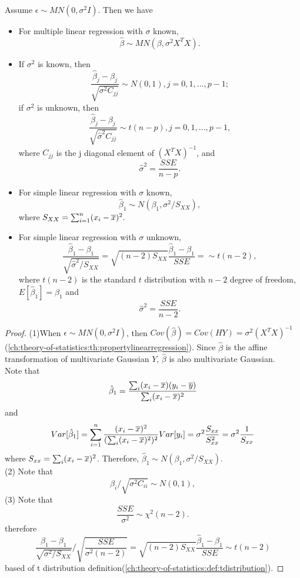 \begin{refsection}
\begin{theorem}\cite[93]{montgomery2012introduction}\label{ch:statistical-models:th:distributionOfCoefficientsLinearRegression}
	Assume $\epsilon \sim MN(0,\sigma^2 I)$. Then we have
	\begin{itemize}
		\item For multiple linear regression with $\sigma$ known, $$\hat{\beta} \sim MN(\beta,\sigma^2 X^TX).$$
		\item If $\sigma^2$ is known, then
		$$\frac{\hat{\beta}_j - \beta_j}{\sqrt{\sigma^2C_{jj}}} \sim N(0,1), j=0,1,...,p-1;$$
		if $\sigma^2$ is unknown, then
		$$\frac{\hat{\beta}_j - \beta_j}{\sqrt{\hat{\sigma}^2C_{jj}}}\sim t(n-p),j=0,1,...,p-1,$$
		where $C_{jj}$ is the j diagonal element of $(X^TX)^{-1}$, and $$\hat{\sigma}^2 = \frac{SSE}{n-p}.$$
		\item For simple linear regression with $\sigma$ known, $$\hat{\beta}_1 \sim N(\beta_1,\sigma^2/S_{XX}),$$ where
		$S_{XX} = \sum_{i=1}^n (x_i - \overline{x})^2.$
		\item For simple linear regression with $\sigma$ unknown, $$  \frac{\hat{\beta}_1 - \beta_{1}}{\sqrt{\hat{\sigma}^2/S_{XX}}} = \sqrt{(n-2)S_{XX}}\frac{\hat{\beta}_1 - \beta_{1}}{SSE} = \sim t(n-2),$$
		where $t(n-2)$ is the standard $t$ distribution with $n-2$ degree of freedom, $E[\hat{\beta}_1] = \beta_1$ and 
		$$\hat{\sigma}^2 = \frac{SSE}{n-2}.$$
	\end{itemize}	
\end{theorem}
\begin{proof}
	(1)When $\epsilon \sim MN(0,\sigma^2 I)$, then $Cov(\hat{\beta}) = Cov(HY) = \sigma^2 (X^TX)^{-1}$(\autoref{ch:theory-of-statistics:th:propertylinearregression}). Since $\hat{\beta}$ is the affine transformation of multivariate Gaussian $Y$, $\hat{\beta}$ is also multivariate Gaussian.\\
	Note that 
	$$\hat{\beta}_1 = \frac{\sum_i (x_{i}-\overline{x})(y_i - \overline{y})}{\sum_i (x_{i}-\overline{x})^2}  $$
	and
	$$Var[\hat{\beta}_1] = \sum_{i=1}^n \frac{ (x_{i}-\overline{x})^2}{(\sum_i (x_{i}-\overline{x})^2)^2} Var[y_i] = \sigma^2 \frac{S_{xx}}{S_{xx}^2}= \sigma^2 \frac{1}{S_{xx}}$$
	where $S_{xx} = \sum_i (x_{i}-\overline{x})^2$.
	Therefore, $\hat{\beta}_1 \sim N(\beta_{1}, \sigma^2/S_{XX})$.\\
	(2) Note that
	$$\hat{\beta}_i/\sqrt{\sigma^2 C_{ii}} \sim N(0,1),$$
	(3) Note that $$\frac{SSE}{\sigma^2}\sim \chi^2(n-2).$$
	therefore
	$$ \frac{\hat{\beta}_1 - \beta_{1}}{\sqrt{\sigma^2/S_{XX}}}/\sqrt{\frac{SSE}{\sigma^2(n-2)}} = \sqrt{(n-2)S_{XX}}\frac{\hat{\beta}_1 - \beta_{1}}{SSE} \sim t(n-2)$$
	based of t distribution definition(\autoref{ch:theory-of-statistics:def:tdistribution}).
\end{proof}


\end{refsection}
